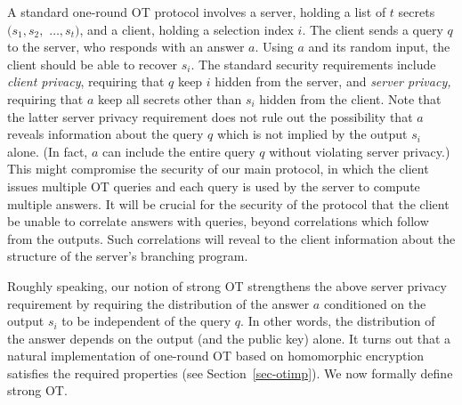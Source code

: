 \documentclass[11pt]{article}
\newcommand\ot{\mbox{OT}\xspace}
\begin{document}
A standard one-round OT protocol involves a server, holding a list of
$t$ secrets $(s_1,s_2,$ $\ldots,s_t)$, and a client, holding a
selection index $i$. The client sends a query $q$ to the server, who
responds with an answer $a$. Using $a$ and its random input, the
client should be able to recover $s_i$. The standard security
requirements include {\em client privacy}, requiring that $q$ keep
$i$ hidden from the server, and {\em server privacy,} requiring that
$a$ keep all secrets other than $s_i$ hidden from the client. Note
that the latter server privacy requirement does not rule out the
possibility that $a$ reveals information about the query $q$ which is
not implied by the output $s_i$ alone. (In fact, $a$ can include the
entire query $q$ without violating server privacy.) This might
compromise the security of our main protocol, in which the client
issues multiple OT queries and each query is used by the server to
compute multiple answers. It will be crucial for the security of the
protocol that the client be unable to correlate answers with queries,
beyond correlations which follow from the outputs. Such correlations
will reveal to the client information about the structure of the
server's branching program.

Roughly speaking, our notion of strong OT strengthens the above
server privacy requirement by requiring the distribution of the
answer $a$  conditioned on the output $s_i$ to be independent of the
query $q$. In other words, the distribution of the answer depends on
the output (and the public key) alone. It turns out that a natural
implementation of one-round \ot based on homomorphic
encryption~\cite{KO97,Ste98} satisfies the required properties (see
Section~\ref{sec-otimp}). We now formally define strong \ot.
\end{document}
